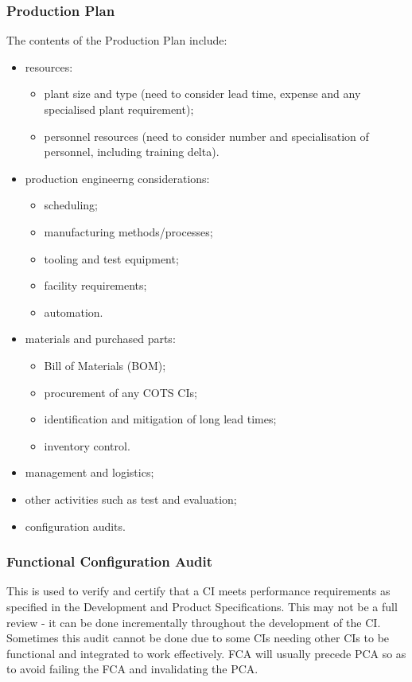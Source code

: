 \documentclass[journal]{IEEEtran}
\begin{document}
\subsubsection{\textbf{Production Plan}}
The contents of the Production Plan include:
\begin{itemize}
	\item resources:
	\begin{itemize}
		\item plant size and type (need to consider lead time, expense and any specialised plant requirement);
		\item personnel resources (need to consider number and specialisation of personnel, including training delta).
	\end{itemize}
	\item production engineerng considerations:
	\begin{itemize}
		\item scheduling;
		\item manufacturing methods/processes;
		\item tooling and test equipment;
		\item facility requirements;
		\item automation.
	\end{itemize}
	\item materials and purchased parts:
	\begin{itemize}
		\item Bill of Materials (BOM);
		\item procurement of any COTS CIs;
		\item identification and mitigation of long lead times;
		\item inventory control.
	\end{itemize}
	\item management and logistics;
	\item other activities such as test and evaluation;
	\item configuration audits.
\end{itemize}
\subsubsection{\textbf{Functional Configuration Audit}}
This is used to verify and certify that a CI meets performance requirements as specified in the Development and Product Specifications. This may not be a full review - it can be done incrementally throughout the development of the CI. Sometimes this audit cannot be done due to some CIs needing other CIs to be functional and integrated to work effectively. FCA will usually precede PCA so as to avoid failing the FCA and invalidating the PCA.
\end{document}
